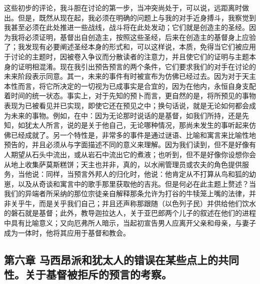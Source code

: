 这些初步的评论，我斗胆在讨论的第一步，当冲突尚处于，可以说，远距离时做出。但是，既然从现在起，我必须在明确的问题上与我的对手近身搏斗，我察觉到我甚至必须在此处推进一些战线，战斗将在此处发动；它们就是创造主的圣经。因为我将必须证明，基督出自创造主，按照这些圣经，后来在创造主的基督身上应验了；我发现有必要阐述圣经本身的形式和，可以这样说，本质，免得当它们被应用于讨论的主题时，因被卷入争议而分散读者的注意力，并且使它们的证明与主题本身的证明相混淆。现在我引出预告预言的两个条件，它们要求我们的对手在讨论的未来阶段表示同意。其一，未来的事件有时被宣布为仿佛已经过去。因为对于天主本性而言，将它所决定的一切视为已成事实是合宜的，因为在他内，永恒自身支配着时间的统一状态。事实上，对于先知的预卜而言，更自然的是，将所预见的事物表现为已被看见并已实现，即使它还在预见之中；换句话说，就是无论如何都会成为未来的事物。例如，在中：因为无论那时说话的是基督，如我们所持，还是先知，如犹太人所言，说的是关于他自己，无论哪种情况，那尚未发生的事听起来仿佛已经成就了。另一个特性是，非常多的事件是通过谜语、比喻和寓言来比喻性地预告的，并且必须从与字面描述不同的意义来理解。因为我们读到，但不是好像有人期望从石头中流出，或从岩石中流出它的煮液；也听到，但不是好像你设想你会从地上收集萨莫斯糕饼；天主也并非，真的，以水闸管理员或农夫的角色提供服务，当他说：同样，当预言外邦人的归化时，他说：他肯定从不打算从鸟和狐的幼崽，以及从奇谈和寓言中的歌手那里获取他的吉兆。但是何必在此主题上赘述？当我们的异端者所采纳的那位宗徒亲自解释那条允许为打谷的牛犊笼上嘴的法律，并非关乎牛，而是关乎我们自己；并且还声称那跟随（以色列子民）并供给他们饮水的磐石就是基督；此外，教导迦拉达人，关于亚巴郎两个儿子的叙述在他们的进程中具有比喻意义；又向厄弗所人暗示，当起初宣告男人应离开父亲和母亲，与妻子成为一体时，他将其应用于基督和教会。\par


\subsection{第六章 马西昂派和犹太人的错误在某些点上的共同性。关于基督被拒斥的预言的考察。}

